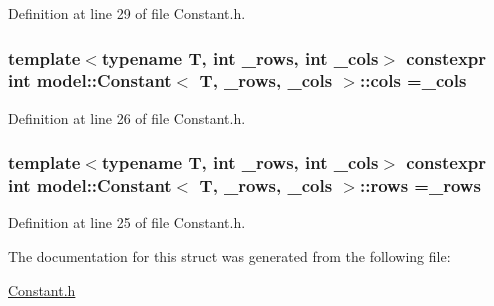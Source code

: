 Definition at line 29 of file Constant.\+h.

\hypertarget{structmodel_1_1_constant_af72c70be0dc73ed0be09327406931018}{}
\subsubsection[{cols}]{\setlength{\rightskip}{0pt plus 5cm}template$<$typename T, int \+\_\+rows, int \+\_\+cols$>$ constexpr int {\bf model\+::\+Constant}$<$ {\bf T}, \+\_\+rows, \+\_\+cols $>$\+::cols =\+\_\+cols\hspace{0.3cm}{\ttfamily [static]}}\label{structmodel_1_1_constant_af72c70be0dc73ed0be09327406931018}


Definition at line 26 of file Constant.\+h.

\hypertarget{structmodel_1_1_constant_aeb202879ffe234d2b719be1e5739523c}{}
\subsubsection[{rows}]{\setlength{\rightskip}{0pt plus 5cm}template$<$typename T, int \+\_\+rows, int \+\_\+cols$>$ constexpr int {\bf model\+::\+Constant}$<$ {\bf T}, \+\_\+rows, \+\_\+cols $>$\+::rows =\+\_\+rows\hspace{0.3cm}{\ttfamily [static]}}\label{structmodel_1_1_constant_aeb202879ffe234d2b719be1e5739523c}


Definition at line 25 of file Constant.\+h.



The documentation for this struct was generated from the following file\+:\begin{DoxyCompactItemize}
\item 
\hyperlink{_constant_8h}{Constant.\+h}\end{DoxyCompactItemize}
